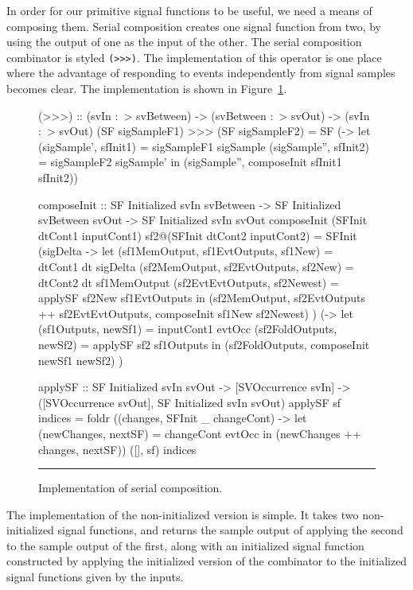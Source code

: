 In order for our primitive signal functions to be useful, we need a means of
composing them. Serial composition creates one signal function from two, by
using the output of one as the input of the other. The serial composition
combinator is styled {\tt (>>>)}. The implementation of this operator is one
place where the advantage of responding to events independently from signal
samples becomes clear. The implementation is shown in Figure~\ref{figure:serial_composition_implementation}.

\begin{figure}
\begin{code}
(>>>) ::    (svIn :~> svBetween) 
         -> (svBetween :~> svOut)
         -> (svIn :~> svOut)
(SF sigSampleF1) >>> (SF sigSampleF2) =
  SF (\sigSample -> let (sigSample', sfInit1) = sigSampleF1 sigSample
                        (sigSample'', sfInit2) = sigSampleF2 sigSample'
                    in (sigSample'', composeInit sfInit1 sfInit2))

composeInit ::     SF Initialized svIn svBetween
                -> SF Initialized svBetween svOut
                -> SF Initialized svIn svOut
composeInit (SFInit dtCont1 inputCont1) sf2@(SFInit dtCont2 inputCont2) =
  SFInit
    (\dt sigDelta -> 
       let (sf1MemOutput, sf1EvtOutputs, sf1New) = dtCont1 dt sigDelta
           (sf2MemOutput, sf2EvtOutputs, sf2New) = dtCont2 dt sf1MemOutput
           (sf2EvtEvtOutputs, sf2Newest) = applySF sf2New sf1EvtOutputs
       in (sf2MemOutput,
           sf2EvtOutputs ++ sf2EvtEvtOutputs,
           composeInit sf1New sf2Newest)
    )
    (\evtOcc -> 
      let (sf1Outputs, newSf1) = inputCont1 evtOcc
          (sf2FoldOutputs, newSf2) = applySF sf2 sf1Outputs
      in (sf2FoldOutputs, composeInit newSf1 newSf2)   
    )

applySF ::    SF Initialized svIn svOut
           -> [SVOccurrence svIn]
           -> ([SVOccurrence svOut],
               SF Initialized svIn svOut)
applySF sf indices =
  foldr (\evtOcc (changes, SFInit _ changeCont) ->
           let (newChanges, nextSF) = changeCont evtOcc
               in (newChanges ++ changes, nextSF))
        ([], sf)
        indices
\end{code}
\hrule
\caption{Implementation of serial composition.}
\label{figure:serial_composition_implementation}
\end{figure}

The implementation of the non-initialized version is simple. It takes two
non-initialized signal functions, and returns the sample output of applying the
second to the sample output of the first, along with an initialized signal
function constructed by applying the initialized version of the combinator to
the initialized signal functions given by the inputs.

